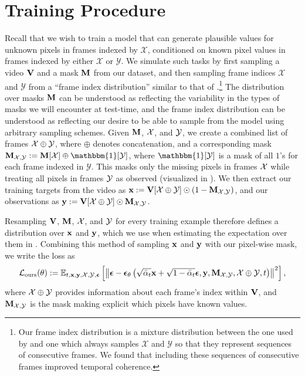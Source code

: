 \section{Training Procedure} 
Recall that we wish to train a model that can generate plausible values for unknown pixels in frames indexed by $\mathcal{X}$, conditioned on known pixel values in frames indexed by either $\mathcal{X}$ or $\mathcal{Y}$. We simulate such tasks by first sampling a video $\mathbf{V}$ and a mask $\mathbf{M}$ from our dataset,  and then sampling frame indices $\mathcal{X}$ and $\mathcal{Y}$ from a ``frame index distribution'' similar to that of \citet{fdm}.\footnote{Our frame index distribution is a mixture distribution between the one used by \citet{fdm} and one which always samples $\mathcal{X}$ and $\mathcal{Y}$ so that they represent sequences of consecutive frames. We found that including these sequences of consecutive frames improved temporal coherence.}
The distribution over masks $\mathbf{M}$ can be understood as reflecting the variability in the types of masks we will encounter at test-time, and the frame index distribution can be understood as reflecting our desire to be able to sample from the model using arbitrary sampling schemes. Given $\mathbf{M}$, $\mathcal{X}$, and $\mathcal{Y}$, we create a combined list of frames $\mathcal{X} \oplus \mathcal{Y}$, where $\oplus$ denotes concatenation, and a corresponding mask $\bM_{\fX,\fY} := \bM[\fX] \oplus \mathbbm{1}[\fY]$, where $\mathbbm{1}[\mathcal{Y}]$ is a mask of all $1$'s for each frame indexed in $\mathcal{Y}$. This masks only the missing pixels in frames $\mathcal{X}$ while treating all pixels in frames $\mathcal{Y}$ as observed (visualized in ).
We then extract our training targets from the video as $\mathbf{x} := \mathbf{V}[\mathcal{X}\oplus\mathcal{Y}] \odot (1-\mathbf{M}_{\mathcal{X},\mathcal{Y}})$, and our observations as $\mathbf{y} := \mathbf{V}[\mathcal{X}\oplus\mathcal{Y}] \odot \mathbf{M}_{\mathcal{X},\mathcal{Y}}$.

Resampling $\mathbf{V}$, $\mathbf{M}$, $\mathcal{X}$, and $\mathcal{Y}$ for every training example therefore defines a distribution over $\mathbf{x}$ and $\mathbf{y}$, which we use when estimating the expectation over them in . Combining this method of sampling $\mathbf{x}$ and $\mathbf{y}$ with our pixel-wise mask, we write the loss as
\begin{equation}
    \mathcal{L}_{\text{ours}}(\theta):=\mathbb{E}_{t, \mathbf{x}, \mathbf{y}, \mathcal{X}, \mathcal{Y}, \boldsymbol{\epsilon}}\left[\left\|\boldsymbol{\epsilon}-\boldsymbol{\epsilon}_\theta\left(\sqrt{\bar{\alpha}_t} \mathbf{x}+\sqrt{1-\bar{\alpha}_t} \boldsymbol{\epsilon}, \mathbf{y}, \mathbf{M}_{\mathcal{X},\mathcal{Y}}, \mathcal{X}\oplus\mathcal{Y}, t\right)\right\|^2\right],
    \label{eq:lours}
\end{equation}
where $\mathcal{X}\oplus\mathcal{Y}$ provides information about each frame's index within $\mathbf{V}$, and $\mathbf{M}_{\mathcal{X},\mathcal{Y}}$ is the mask making explicit which pixels have known values.




